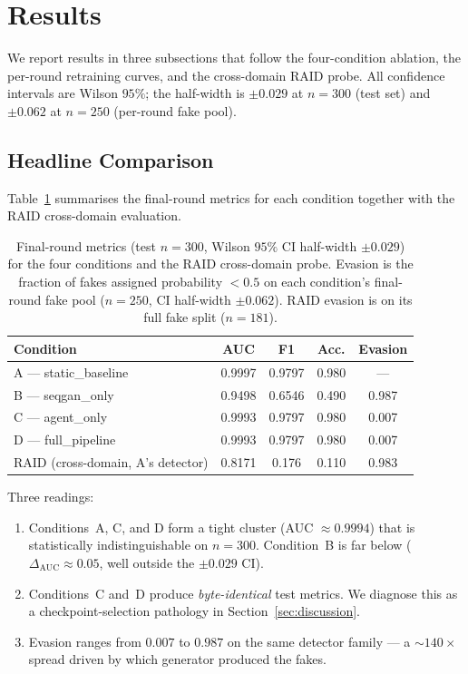 \section{Results}
\label{sec:results}

We report results in three subsections that follow the four-condition
ablation, the per-round retraining curves, and the cross-domain RAID
probe. All confidence intervals are Wilson \(95\%\); the half-width is
\(\pm 0.029\) at \(n = 300\) (test set) and \(\pm 0.062\) at
\(n = 250\) (per-round fake pool).

\subsection{Headline Comparison}
\label{ssec:headline}

Table~\ref{tab:headline} summarises the final-round metrics for each
condition together with the RAID cross-domain evaluation.

\begin{table}[t]
\caption{Final-round metrics (test \(n=300\), Wilson \(95\%\) CI half-width
\(\pm 0.029\)) for the four conditions and the RAID cross-domain probe.
Evasion is the fraction of fakes assigned probability $<0.5$ on each
condition's final-round fake pool (\(n=250\), CI half-width \(\pm 0.062\)).
RAID evasion is on its full fake split (\(n=181\)).}
\label{tab:headline}
\centering
\renewcommand{\arraystretch}{1.15}
\begin{tabular}{@{}lcccc@{}}
\toprule
\textbf{Condition} & \textbf{AUC} & \textbf{F1} & \textbf{Acc.} & \textbf{Evasion} \\
\midrule
A — static\_baseline      & 0.9997 & 0.9797 & 0.980 & --- \\
B — seqgan\_only          & 0.9498 & 0.6546 & 0.490 & 0.987 \\
C — agent\_only           & 0.9993 & 0.9797 & 0.980 & 0.007 \\
D — full\_pipeline        & 0.9993 & 0.9797 & 0.980 & 0.007 \\
\midrule
RAID (cross-domain, A's detector)
                          & 0.8171 & 0.176  & 0.110 & 0.983 \\
\bottomrule
\end{tabular}
\end{table}

Three readings:
\begin{enumerate}[leftmargin=*]
\item Conditions~A, C, and D form a tight cluster
  (AUC \(\approx 0.9994\)) that is statistically indistinguishable on
  \(n=300\). Condition~B is far below
  (\(\Delta_{\mathrm{AUC}} \approx 0.05\), well outside the
  \(\pm 0.029\) CI).
\item Conditions~C and~D produce \emph{byte-identical} test metrics. We
  diagnose this as a checkpoint-selection pathology in
  Section~\ref{sec:discussion}.
\item Evasion ranges from \(0.007\) to \(0.987\) on the same detector
  family — a $\sim$\(140\times\) spread driven by which generator
  produced the fakes.
\end{enumerate}

